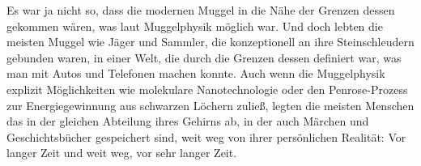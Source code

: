 Es war ja nicht so, dass die modernen Muggel in die Nähe der Grenzen dessen gekommen wären, was laut Muggelphysik möglich war. Und doch lebten die meisten Muggel wie Jäger und Sammler, die konzeptionell an ihre Steinschleudern gebunden waren, in einer Welt, die durch die Grenzen dessen definiert war, was man mit Autos und Telefonen machen konnte. Auch wenn die Muggelphysik explizit Möglichkeiten wie molekulare Nanotechnologie oder den Penrose-Prozess zur Energiegewinnung aus schwarzen Löchern zuließ, legten die meisten Menschen das in der gleichen Abteilung ihres Gehirns ab, in der auch Märchen und Geschichtsbücher gespeichert sind, weit weg von ihrer persönlichen Realität: Vor langer Zeit und weit weg, vor sehr langer Zeit.
